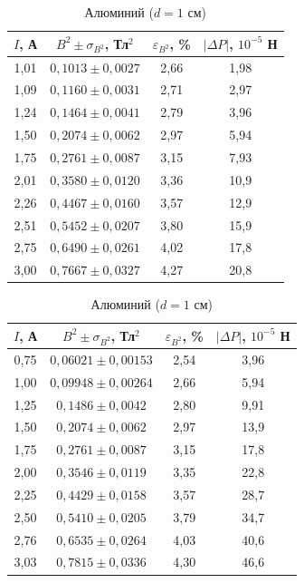 \documentclass[a4paper]{article}
\begin{document}
\begin{enumerate}
\begin{table}[h!]
    \centering
    \begin{minipage}{0.48\textwidth}
        \centering
        \begin{tabular}{|c|c|c|c|}
            \hline
            $I$, А & $B^2 \pm \sigma_{B^2}$, Тл$^2$ & $\varepsilon_{B^2}$, \% & $|\Delta P|$, $10^{-5}$ Н \\ \hline
        1,01 & $0,1013 \pm 0,0027$ & 2,66 & 1,98 \\ \hline
        1,09 & $0,1160 \pm 0,0031$ & 2,71 & 2,97 \\ \hline
        1,24 & $0,1464 \pm 0,0041$ & 2,79 & 3,96 \\ \hline
        1,50 & $0,2074 \pm 0,0062$ & 2,97 & 5,94 \\ \hline
        1,75 & $0,2761 \pm 0,0087$ & 3,15 & 7,93 \\ \hline
        2,01 & $0,3580 \pm 0,0120$ & 3,36 & 10,9 \\ \hline
        2,26 & $0,4467 \pm 0,0160$ & 3,57 & 12,9 \\ \hline
        2,51 & $0,5452 \pm 0,0207$ & 3,80 & 15,9 \\ \hline
        2,75 & $0,6490 \pm 0,0261$ & 4,02 & 17,8 \\ \hline
        3,00 & $0,7667 \pm 0,0327$ & 4,27 & 20,8 \\ \hline
        \end{tabular}
        \caption{Медь ($d = 1$ см)}
        \label{tab:copper}
    \end{minipage}
    \hfill
    \begin{minipage}{0.48\textwidth}
        \centering
        \begin{tabular}{|c|c|c|c|}
            \hline
            $I$, А & $B^2 \pm \sigma_{B^2}$, Тл$^2$ & $\varepsilon_{B^2}$, \% & $|\Delta P|$, $10^{-5}$ Н \\ \hline
        0,75 & $0,06021 \pm 0,00153$ & 2,54 & 3,96 \\ \hline
        1,00 & $0,09948 \pm 0,00264$ & 2,66 & 5,94 \\ \hline
        1,25 & $0,1486 \pm 0,0042$ & 2,80 & 9,91 \\ \hline
        1,50 & $0,2074 \pm 0,0062$ & 2,97 & 13,9 \\ \hline
        1,75 & $0,2761 \pm 0,0087$ & 3,15 & 17,8 \\ \hline
        2,00 & $0,3546 \pm 0,0119$ & 3,35 & 22,8 \\ \hline
        2,25 & $0,4429 \pm 0,0158$ & 3,57 & 28,7 \\ \hline
        2,50 & $0,5410 \pm 0,0205$ & 3,79 & 34,7 \\ \hline
        2,76 & $0,6535 \pm 0,0264$ & 4,03 & 40,6 \\ \hline
        3,03 & $0,7815 \pm 0,0336$ & 4,30 & 46,6 \\ \hline
        \end{tabular}
        \caption{Алюминий ($d = 1$ см)}
        \label{tab:aluminum}
    \end{minipage}
\end{table}


\end{enumerate}
\end{document}
